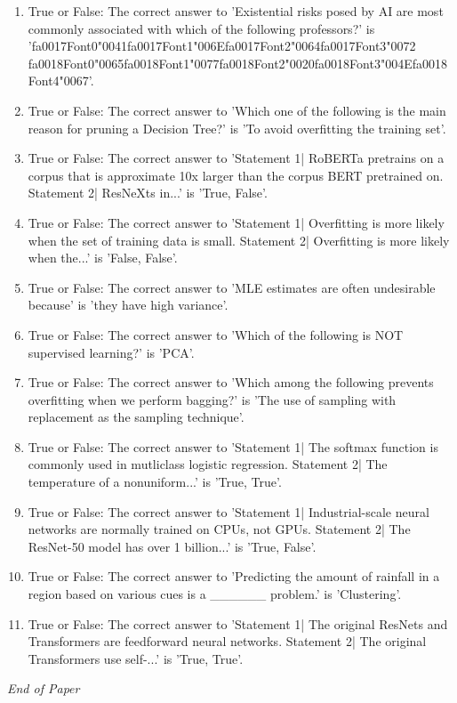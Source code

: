 \documentclass[12pt]{article}
\begin{document}
\begin{enumerate}[label=\arabic*.]
\item True or False: The correct answer to 'Existential risks posed by AI are most commonly associated with which of the following professors?' is '{\csname fa0017Font0\endcsname\char"0041}{\csname fa0017Font1\endcsname\char"006E}{\csname fa0017Font2\endcsname\char"0064}{\csname fa0017Font3\endcsname\char"0072} {\csname fa0018Font0\endcsname\char"0065}{\csname fa0018Font1\endcsname\char"0077}{\csname fa0018Font2\endcsname\char"0020}{\csname fa0018Font3\endcsname\char"004E}{\csname fa0018Font4\endcsname\char"0067}'.
\item True or False: The correct answer to 'Which one of the following is the main reason for pruning a Decision Tree?' is 'To avoid overfitting the training set'.
\item True or False: The correct answer to 'Statement 1| RoBERTa pretrains on a corpus that is approximate 10x larger than the corpus BERT pretrained on. Statement 2| ResNeXts in...' is 'True, False'.
\item True or False: The correct answer to 'Statement 1| Overfitting is more likely when the set of training data is small. Statement 2| Overfitting is more likely when the...' is 'False, False'.
\item True or False: The correct answer to 'MLE estimates are often undesirable because' is 'they have high variance'.
\item True or False: The correct answer to 'Which of the following is NOT supervised learning?' is 'PCA'.
\item True or False: The correct answer to 'Which among the following prevents overfitting when we perform bagging?' is 'The use of sampling with replacement as the sampling technique'.
\item True or False: The correct answer to 'Statement 1| The softmax function is commonly used in mutliclass logistic regression. Statement 2| The temperature of a nonuniform...' is 'True, True'.
\item True or False: The correct answer to 'Statement 1| Industrial-scale neural networks are normally trained on CPUs, not GPUs. Statement 2| The ResNet-50 model has over 1 billion...' is 'True, False'.
\item True or False: The correct answer to 'Predicting the amount of rainfall in a region based on various cues is a \_\_\_\_\_\_ problem.' is 'Clustering'.
\item True or False: The correct answer to 'Statement 1| The original ResNets and Transformers are feedforward neural networks. Statement 2| The original Transformers use self-...' is 'True, True'.
\end{enumerate}

\vfill
\noindent\textit{End of Paper}
\end{document}
